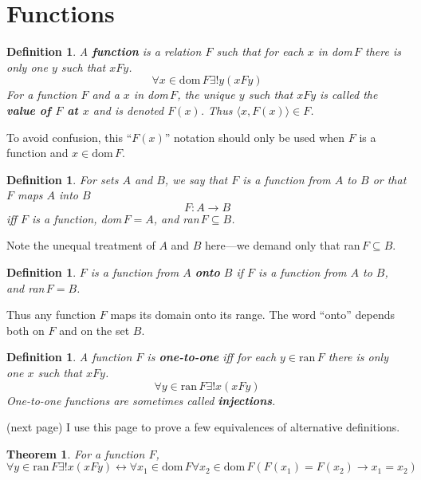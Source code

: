 \documentclass{report}
\newtheorem{theorem}[theo]{Theorem}
\newtheorem{definition}[theo]{Definition}
\begin{document}
\section{Functions}
\begin{definition}
A \textbf{function} is a relation $F$ such that for each $x$ in dom$\,F$ there is only one $y$ such that $xFy$.
\begin{equation*}
\forall x\in\text{dom$\,F$}\exists!y(xFy)
\end{equation*}
For a function $F$ and a $x$ in dom$\,F$, the unique $y$ such that $xFy$ is called the \textbf{value of $F$ at $x$} and is denoted $F(x)$. Thus $\langle x,F(x)\rangle\in F$.
\end{definition}
\noindent To avoid confusion, this ``$F(x)$'' notation should only be used when $F$ is a function and $x\in\text{dom}\,F$.
\begin{definition}
For sets $A$ and $B$, we say that $F$ is a function \textit{from $A$ to $B$} or that $F$ \textit{maps $A$ into $B$}
\begin{equation*}
F:A\to B
\end{equation*}
iff $F$ is a function, dom$\,F=A$, and ran$\,F\subseteq B$. 
\end{definition}
\noindent Note the unequal treatment of $A$ and $B$ here---we demand only that ran$\,F\subseteq B$.
\begin{definition}
$F$ is a function from $A$ \textbf{onto} $B$ if $F$ is a function from $A$ to $B$, and ran$\,F=B$.
\end{definition}
\noindent Thus any function $F$ maps its domain onto its range. The word ``onto'' depends both on $F$ and on the set $B$. 
\begin{definition}
A function $F$ is \textbf{one-to-one} iff for each $y\in\text{ran}\,F$ there is only one $x$ such that $xFy$.
\begin{equation*}
\forall y\in\text{ran}\,F\exists!x(xFy)
\end{equation*}
One-to-one functions are sometimes called \textbf{injections}.
\end{definition}
\noindent(next page)
\newpage
\noindent I use this page to prove a few equivalences of alternative definitions.
\begin{theorem}
For a function $F$,
\begin{equation*}
\forall y\in\text{ran}\,F\exists!x(xFy)\leftrightarrow
\forall x_1\in\text{dom}\,F\forall x_2\in\text{dom}\,F(F(x_1)=F(x_2)\to x_1=x_2)
\end{equation*}
\end{theorem}
\end{document}
